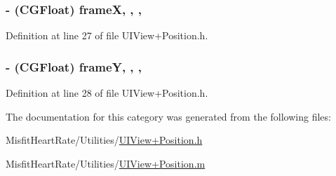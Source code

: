 \hypertarget{category_u_i_view_07_position_08_a16476712cc236d743510b2f39363396d}{
\subsubsection[{frame\+X}]{\setlength{\rightskip}{0pt plus 5cm}-\/ (C\+G\+Float) frame\+X\hspace{0.3cm}{\ttfamily [read]}, {\ttfamily [write]}, {\ttfamily [nonatomic]}, {\ttfamily [assign]}}}\label{category_u_i_view_07_position_08_a16476712cc236d743510b2f39363396d}


Definition at line 27 of file U\+I\+View+\+Position.\+h.

\hypertarget{category_u_i_view_07_position_08_a60a2692ff93131e7bbba22ecf3726f55}{
\subsubsection[{frame\+Y}]{\setlength{\rightskip}{0pt plus 5cm}-\/ (C\+G\+Float) frame\+Y\hspace{0.3cm}{\ttfamily [read]}, {\ttfamily [write]}, {\ttfamily [nonatomic]}, {\ttfamily [assign]}}}\label{category_u_i_view_07_position_08_a60a2692ff93131e7bbba22ecf3726f55}


Definition at line 28 of file U\+I\+View+\+Position.\+h.



The documentation for this category was generated from the following files\+:\begin{DoxyCompactItemize}
\item 
Misfit\+Heart\+Rate/\+Utilities/\hyperlink{_u_i_view_09_position_8h}{U\+I\+View+\+Position.\+h}\item 
Misfit\+Heart\+Rate/\+Utilities/\hyperlink{_u_i_view_09_position_8m}{U\+I\+View+\+Position.\+m}\end{DoxyCompactItemize}
